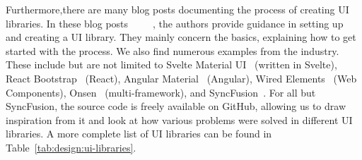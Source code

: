 Furthermore,there are many blog posts documenting the process of creating UI libraries. In these blog posts~~~~~, the authors provide guidance in setting up and creating a UI library. They mainly concern the basics, explaining how to get started with the process.
We also find numerous examples from the industry. These include but are not limited to Svelte Material UI~ (written in Svelte), React Bootstrap~ (React), Angular Material~ (Angular), Wired Elements~ (Web Components), Onsen~ (multi-framework), and SyncFusion~. For all but SyncFusion, the source code is freely available on GitHub, allowing us to draw inspiration from it and look at how various problems were solved in different UI libraries. A more complete list of UI libraries can be found in Table~\ref{tab:design:ui-libraries}.

